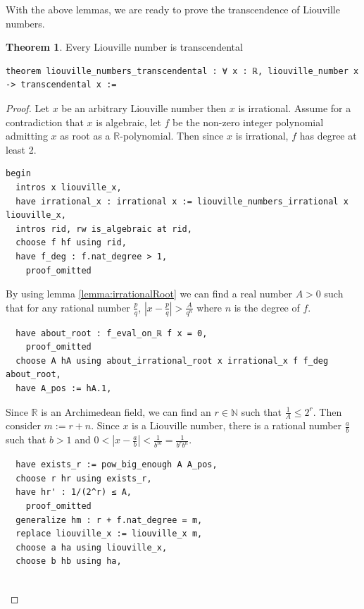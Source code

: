 \documentclass{report}
\theoremstyle{definition}
\newtheorem{theorem}{Theorem}[section]
\begin{document}
With the above lemmas, we are ready to prove the transcendence of Liouville numbers.
\begin{theorem}\label{thm:liouvilleTrans}
Every Liouville number is transcendental
\begin{verbatim}
theorem liouville_numbers_transcendental : ∀ x : ℝ, liouville_number x -> transcendental x := 
\end{verbatim}
\end{theorem}

\begin{proof}
Let $x$ be an arbitrary Liouville number then $x$ is irrational. Assume for a contradiction that $x$ is algebraic, let $f$ be the non-zero integer polynomial admitting $x$ as root as a $\mathbb R$-polynomial. Then since $x$ is irrational, $f$ has degree at least 2.

\begin{verbatim}
begin
  intros x liouville_x,
  have irrational_x : irrational x := liouville_numbers_irrational x liouville_x,
  intros rid, rw is_algebraic at rid,
  choose f hf using rid, 
  have f_deg : f.nat_degree > 1,
    proof_omitted
\end{verbatim}

By using lemma \ref{lemma:irrationalRoot} we can find a real number $A>0$ such that for any rational number $\frac pq$, $\left|x-\frac pq\right|>\frac A{q^n}$ where $n$ is the degree of $f$.
\begin{verbatim} 
  have about_root : f_eval_on_ℝ f x = 0,
    proof_omitted
  choose A hA using about_irrational_root x irrational_x f f_deg about_root,
  have A_pos := hA.1,
\end{verbatim}

Since $\mathbb R$ is an Archimedean field, we can find an $r\in\mathbb N$ such that $\frac1A\le2^r$. Then consider $m:=r+n$. Since $x$ is a Liouville number, there is a rational number $\frac a b$ such that $b>1$ and $0<\left|x-\frac a b\right|<\frac1{b^m}=\frac1{b^r b^n}$.
\begin{verbatim} 
  have exists_r := pow_big_enough A A_pos, 
  choose r hr using exists_r,
  have hr' : 1/(2^r) ≤ A,
    proof_omitted
  generalize hm : r + f.nat_degree = m,
  replace liouville_x := liouville_x m,
  choose a ha using liouville_x,
  choose b hb using ha,


\end{verbatim}
\end{proof}
\end{document}
